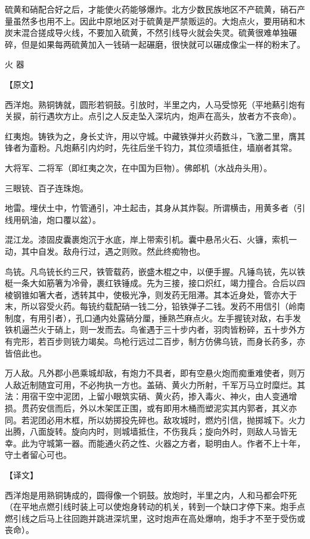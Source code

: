 \documentclass[12pt,UTF8]{ctexbook}
\begin{document}
硫黄和硝配合好之后，才能使火药能够爆炸。北方少数民族地区不产硫黄，硝石产量虽然多也用不上。因此中原地区对于硫黄是严禁贩运的。大炮点火，要用硝和木炭末混合搓成导火线，不要加入硫黄，不然引线导火就会失灵。硫黄很难单独碾碎，但是如果每两硫黄加入一钱硝一起碾磨，很快就可以碾成像尘一样的粉末了。

火 器

【原文】

西洋炮。熟铜铸就，圆形若铜鼓。引放时，半里之内，人马受惊死（平地爇引炮有关捩，前行遇坎方止。点引之人反走坠入深坑内，炮声在高头，放者方不丧命）。

红夷炮。铸铁为之，身长丈许，用以守城。中藏铁弹并火药数斗，飞激二里，膺其锋者为齑粉。凡炮爇引内灼时，先往后坐千钧力，其位须墙抵住，墙崩者其常。

大将军、二将军（即红夷之次，在中国为巨物）。佛郎机（水战舟头用）。

三眼铳、百子连珠炮。

地雷。埋伏土中，竹管通引，冲土起击，其身从其炸裂。所谓横击，用黄多者（引线用矾油，炮口覆以盆）。

混江龙。漆固皮囊裹炮沉于水底，岸上带索引机。囊中悬吊火石、火镰，索机一动，其中自发。敌舟行过，遇之则败。然此终痴物也。

鸟铳。凡鸟铳长约三尺，铁管载药，嵌盛木棍之中，以便手握。凡锤鸟铳，先以铁梃一条大如筋箸为冷骨，裹红铁锤成。先为三接，接口炽红，竭力撞合。合后以四棱钢锥如箸大者，透转其中，使极光净，则发药无阻滞。其本近身处，管亦大于末，所以容受火药。每铳约载配硝一钱二分，铅铁弹子二钱。发药不用信引（岭南制度，有用引者），孔口通内处露硝分厘，捶熟苎麻点火。左手握铳对敌，右手发铁机逼苎火于硝上，则一发而去。鸟雀遇于三十步内者，羽肉皆粉碎，五十步外方有完形，若百步则铳力竭矣。鸟枪行远过二百步，制方仿佛乌铳，而身长药多，亦皆倍此也。

万人敌。凡外郡小邑乘城却敌，有炮力不具者，即有空悬火炮而痴重难使者，则万人敌近制随宜可用，不必拘执一方也。盖硝、黄火力所射，千军万马立时糜烂。其法：用宿干空中泥团，上留小眼筑实硝、黄火药，掺入毒火、神火，由人变通增损。贯药安信而后，外以木架匡正围，或有即用木桶而塑泥实其内郭者，其义亦同。若泥团必用木框，所以妨掷投先碎也。敌攻城时，燃灼引信，抛掷城下。火力出腾，八面旋转。旋向内时，则城墙抵住，不伤我兵；旋向外时，则敌人马皆无幸。此为守城第一器。而能通火药之性、火器之方者，聪明由人。作者不上十年，守土者留心可也。

【译文】

西洋炮是用熟铜铸成的，圆得像一个铜鼓。放炮时，半里之内，人和马都会吓死（在平地点燃引线时装上可以使炮身转动的机关，转到一个缺口才停下来。炮手点燃引线之后马上往回跑并跳进深坑里，这时炮声在高处爆响，炮手才不至于受伤或丧命）。
\end{document}
